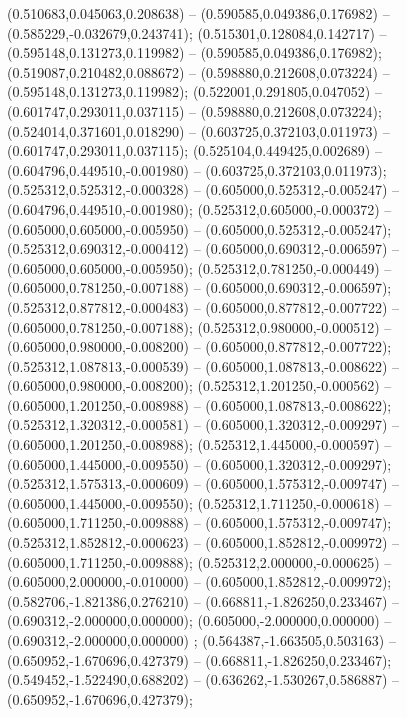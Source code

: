  (0.510683,0.045063,0.208638) -- (0.590585,0.049386,0.176982) -- (0.585229,-0.032679,0.243741);
 (0.515301,0.128084,0.142717) -- (0.595148,0.131273,0.119982) -- (0.590585,0.049386,0.176982);
 (0.519087,0.210482,0.088672) -- (0.598880,0.212608,0.073224) -- (0.595148,0.131273,0.119982);
 (0.522001,0.291805,0.047052) -- (0.601747,0.293011,0.037115) -- (0.598880,0.212608,0.073224);
 (0.524014,0.371601,0.018290) -- (0.603725,0.372103,0.011973) -- (0.601747,0.293011,0.037115);
 (0.525104,0.449425,0.002689) -- (0.604796,0.449510,-0.001980) -- (0.603725,0.372103,0.011973);
 (0.525312,0.525312,-0.000328) -- (0.605000,0.525312,-0.005247) -- (0.604796,0.449510,-0.001980);
 (0.525312,0.605000,-0.000372) -- (0.605000,0.605000,-0.005950) -- (0.605000,0.525312,-0.005247);
 (0.525312,0.690312,-0.000412) -- (0.605000,0.690312,-0.006597) -- (0.605000,0.605000,-0.005950);
 (0.525312,0.781250,-0.000449) -- (0.605000,0.781250,-0.007188) -- (0.605000,0.690312,-0.006597);
 (0.525312,0.877812,-0.000483) -- (0.605000,0.877812,-0.007722) -- (0.605000,0.781250,-0.007188);
 (0.525312,0.980000,-0.000512) -- (0.605000,0.980000,-0.008200) -- (0.605000,0.877812,-0.007722);
 (0.525312,1.087813,-0.000539) -- (0.605000,1.087813,-0.008622) -- (0.605000,0.980000,-0.008200);
 (0.525312,1.201250,-0.000562) -- (0.605000,1.201250,-0.008988) -- (0.605000,1.087813,-0.008622);
 (0.525312,1.320312,-0.000581) -- (0.605000,1.320312,-0.009297) -- (0.605000,1.201250,-0.008988);
 (0.525312,1.445000,-0.000597) -- (0.605000,1.445000,-0.009550) -- (0.605000,1.320312,-0.009297);
 (0.525312,1.575313,-0.000609) -- (0.605000,1.575312,-0.009747) -- (0.605000,1.445000,-0.009550);
 (0.525312,1.711250,-0.000618) -- (0.605000,1.711250,-0.009888) -- (0.605000,1.575312,-0.009747);
 (0.525312,1.852812,-0.000623) -- (0.605000,1.852812,-0.009972) -- (0.605000,1.711250,-0.009888);
 (0.525312,2.000000,-0.000625) -- (0.605000,2.000000,-0.010000) -- (0.605000,1.852812,-0.009972);
 (0.582706,-1.821386,0.276210) -- (0.668811,-1.826250,0.233467) -- (0.690312,-2.000000,0.000000);
 (0.605000,-2.000000,0.000000) -- (0.690312,-2.000000,0.000000) ;
 (0.564387,-1.663505,0.503163) -- (0.650952,-1.670696,0.427379) -- (0.668811,-1.826250,0.233467);
 (0.549452,-1.522490,0.688202) -- (0.636262,-1.530267,0.586887) -- (0.650952,-1.670696,0.427379);
